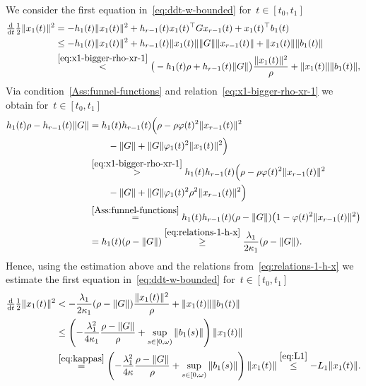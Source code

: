 \documentclass[ envcountsect, envcountsame]{svjour3}
\newcommand{\ddt}{\tfrac{\text{\normalfont d}}{\text{\normalfont d}t}}
\newcommand{\vp}{\varphi}
\begin{document}
%
We consider the first equation in~\eqref{eq:ddt-w-bounded} for~$t \in [t_0,  t_1]$
\begin{equation*}
\begin{aligned}
\ddt \tfrac{1}{2} \|x_1(t)\|^2 &= -h_1(t) \|x_1(t)\|^2 + h_{r-1}(t) x_1(t)^\top Gx_{r-1}(t) + x_1(t)^\top b_1(t) \\
&\le -h_1(t) \| x_1(t)\|^2 + h_{r-1}(t) \|x_1(t)\| \|G\| \|x_{r-1}(t)\| + \|x_1(t)\| \|b_1(t)\| \\
& \overset{\eqref{eq:x1-bigger-rho-xr-1}}{<} \big( -h_1(t) \rho +  h_{r-1}(t) \|G\| \big) \frac{\|x_1(t)\|^2}{\rho} + \|x_1(t)\| \|b_1(t)\| ,
\end{aligned}
\end{equation*}
Via condition~\ref{Ass:funnel-functions} and relation~\eqref{eq:x1-bigger-rho-xr-1} we obtain for~$t \in [t_0, t_1]$
\begin{equation*} %
\begin{aligned}
h_1(t) \rho - h_{r-1}(t) \|G\| &= h_1(t) h_{r-1}(t) \Big(\rho - \rho \vp(t)^2 \|x_{r-1}(t)\|^2 \\
& \qquad - \|G\| + \|G\| \vp_1(t)^2 \|x_1(t)\|^2 \Big) \\
& \overset{\eqref{eq:x1-bigger-rho-xr-1}}{>} h_1(t) h_{r-1}(t) \Big( \rho - \rho \vp(t)^2 \|x_{r-1}(t)\|^2 \\
& \qquad - \|G\| + \|G\| \vp_1(t)^2 \rho^2 \|x_{r-1}(t)\|^2 \Big) \\
& \overset{\rm \ref{Ass:funnel-functions}}{ =} h_1(t) h_{r-1}(t)( \rho - \|G\| ) \big( 1- \vp(t)^2 \|x_{r-1}(t)\|^2 \big) \\
& = h_1(t) (\rho - \|G\| ) 
\overset{\eqref{eq:relations-1-h-x}}{\ge} \frac{\lambda_1}{2 \kappa_1} (\rho - \|G\| ) .
\end{aligned}
\end{equation*}
Hence, using the estimation above and the relations from~\eqref{eq:relations-1-h-x} we estimate the first equation in~\eqref{eq:ddt-w-bounded} for~$t  \in [t_0,  t_1]$
\begin{equation*}
\begin{aligned}
\ddt \tfrac{1}{2} \|x_1(t)\|^2 &< - \frac{\lambda_1}{2 \kappa_1} (\rho - \|G\|) \frac{\|x_1(t)\|^2}{\rho} + \|x_1(t)\| \|b_1(t)\| \\
 & \le \left( - \frac{ \lambda_1^2}{4 \kappa_1} \frac{\rho - \|G\|}{\rho} + \sup_{s \in [0,\omega)}\|b_1(s)\| \right) \|x_1(t)\| \\
  & \overset{\eqref{eq:kappas}}{=} \left( - \frac{ \lambda_1^2}{4 \kappa} \frac{\rho - \|G\|}{\rho} + \sup_{s \in [0,\omega)}\|b_1(s)\| \right) \|x_1(t)\| 
\overset{\eqref{eq:L1}}{\le} - L_1 \|x_1(t)\|.
\end{aligned}
\end{equation*}
\end{document}
